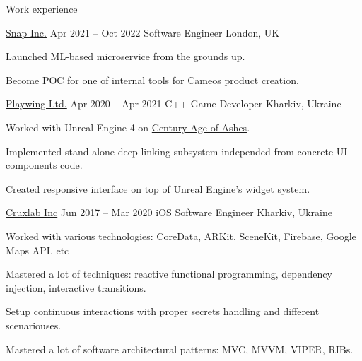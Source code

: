 \newenvironment{work}[5]{ %
    \begin{rSubsection}
        {\href{#2}{#1}}
        {#3}
        {#4}
        {#5}
}{
    \end{rSubsection}
}

\begin{cvsection}{Work experience}
\begin{work}
{Snap Inc.}
{https://snap.com}
{Apr 2021 -- Oct 2022}
{Software Engineer}
{London, UK}
	\item Launched ML-based microservice from the grounds up.
	\item Become POC for one of internal tools for Cameos product creation.
\end{work}

\begin{work}
{Playwing Ltd.}
{https://playwing.com}
{Apr 2020 -- Apr 2021}
{C++ Game Developer}
{Kharkiv, Ukraine}
	\item Worked with Unreal Engine 4 on \href{https://www.century-age-of-ashes.com/}{Century Age of Ashes}.
	\item Implemented stand-alone deep-linking subsystem independed from concrete UI-components code.
	\item Created responsive interface on top of Unreal Engine's widget system.
\end{work}

\begin{work}
{Cruxlab Inc}
{https://cruxlab.com/}
{Jun 2017 -- Mar 2020}
{iOS Software Engineer}
{Kharkiv, Ukraine}
	\item Worked with various technologies: CoreData, ARKit, SceneKit, Firebase, Google Maps API, etc
	\item Mastered a lot of techniques: reactive functional programming, dependency injection, interactive transitions.
	\item Setup continuous interactions with proper secrets handling and different scenariouses.
	\item Mastered a lot of software architectural patterns: MVC, MVVM, VIPER, RIBs.
\end{work}
\end{cvsection}
